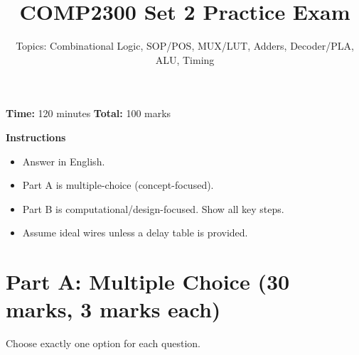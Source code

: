 \documentclass[11pt]{article}
\title{COMP2300 Set 2 Practice Exam}
\author{Topics: Combinational Logic, SOP/POS, MUX/LUT, Adders, Decoder/PLA, ALU, Timing}
\date{}
\begin{document}
\maketitle

\noindent\textbf{Time:} 120 minutes \hfill
\textbf{Total:} 100 marks

\vspace{0.5em}
\noindent\textbf{Instructions}
\begin{itemize}[leftmargin=1.5em]
  \item Answer in English.
  \item Part A is multiple-choice (concept-focused).
  \item Part B is computational/design-focused. Show all key steps.
  \item Assume ideal wires unless a delay table is provided.
\end{itemize}

\section*{Part A: Multiple Choice (30 marks, 3 marks each)}
Choose exactly one option for each question.
\end{document}
